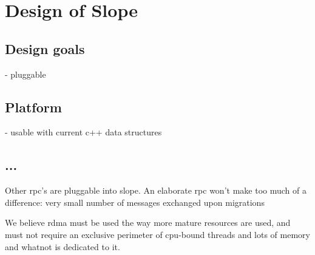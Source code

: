 \chapter{Design of Slope}
\label{chap:design}

\section{Design goals}
- pluggable

\section{Platform}
- usable with current c++ data structures

\section{...}

Other rpc's are pluggable into slope.
An elaborate rpc won't make too much of a difference: very small number of messages exchanged upon migrations

We believe rdma must be used the way more mature resources are used, and must not require an exclusive perimeter of cpu-bound threads and lots of memory and whatnot is dedicated to it.


